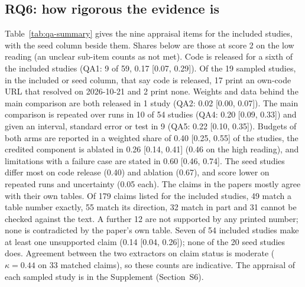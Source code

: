 \subsection{RQ6: how rigorous the evidence is}
\label{sec:rq6}
Table~\ref{tab:qa-summary} gives the nine appraisal items for the included studies, with the seed column beside them. Shares below are those at score 2 on the low reading (an unclear sub-item counts as not met). Code is released for a sixth of the included studies (QA1: 9 of 59, 0.17 [0.07, 0.29]). Of the 19 sampled studies, in the included or seed column, that say code is released, 17 print an own-code URL that resolved on 2026-10-21 and 2 print none. Weights and data behind the main comparison are both released in 1 study (QA2: 0.02 [0.00, 0.07]). The main comparison is repeated over runs in 10 of 54 studies (QA4: 0.20 [0.09, 0.33]) and given an interval, standard error or test in 9 (QA5: 0.22 [0.10, 0.35]). Budgets of both arms are reported in a weighted share of 0.40 [0.25, 0.55] of the studies, the credited component is ablated in 0.26 [0.14, 0.41] (0.46 on the high reading), and limitations with a failure case are stated in 0.60 [0.46, 0.74]. The seed studies differ most on code release (0.40) and ablation (0.67), and score lower on repeated runs and uncertainty (0.05 each). %
The claims in the papers mostly agree with their own tables. Of 179 claims listed for the included studies, 49 match a table number exactly, 55 match its direction, 32 match in part and 31 cannot be checked against the text. A further 12 are not supported by any printed number; none is contradicted by the paper's own table. Seven of 54 included studies make at least one unsupported claim (0.14 [0.04, 0.26]); none of the 20 seed studies does. Agreement between the two extractors on claim status is moderate ($\kappa = 0.44$ on 33 matched claims), so these counts are indicative. %
The appraisal of each sampled study is in the Supplement (Section~S6).

\begin{table}[t]
\caption{Quality appraisal of the sampled included studies (59), of the seed stratum (20) and of the 16 extracted landmark studies (given as the count at score 2 of those scored, and QA1 there without the link check); items defined in Section~\ref{sec:method-extraction}. Columns 0, 1 and 2 give the number of included studies at each score. Shares are the weighted share of the included studies at score 2, with a 95\% interval from a bootstrap over studies within strata (an exact bound on the effective sample size where the count is 0). Low reading: an unclear sub-item counts as not met; high reading: as met. NA: the item does not apply (no main comparison, or a study type without a credited component).}
\label{tab:qa-summary}
\footnotesize

\end{table}
